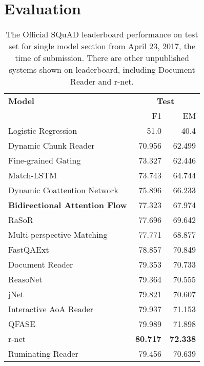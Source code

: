 \documentclass[11pt,letterpaper]{article}
\begin{document}
\section{Evaluation}
\begin{table}[t]
\renewcommand{\thefootnote}{\fnsymbol{footnote}}
\begin{threeparttable}

\centering
\small
\begin{tabular}{l r r}
\toprule

{\bf Model} &
\multicolumn{2}{c}{\bf Test} \\

{}    & F1 & EM \\
\midrule
Logistic Regression\tnote{a} & 51.0 & 40.4\\ 
Dynamic Chunk Reader\tnote{b} & 70.956  & 62.499\\ 
Fine-grained Gating\tnote{c} & 73.327  & 62.446\\ 
Match-LSTM\tnote{d} & 73.743  & 64.744\\
Dynamic Coattention Network\tnote{e} & 75.896  & 66.233\\ 
\textbf{Bidirectional Attention Flow}\tnote{f} & 77.323  & 67.974\\
RaSoR\tnote{g} & 77.696  & 69.642\\
Multi-perspective Matching\tnote{h}& 77.771  & 68.877 \\ 
FastQAExt\tnote{i}& 78.857 & 70.849 \\
Document Reader\tnote{j} & 79.353 & 70.733\\
ReasoNet\tnote{k}& 79.364 & 70.555  \\
jNet\tnote{l}& 79.821  & 70.607 \\
Interactive AoA Reader\tnote{} & 79.937 & 71.153 \\
QFASE\tnote{} & 79.989 & 71.898 \\
r-net\tnote{} & \textbf{80.717} & \textbf{72.338} \\
\midrule
Ruminating Reader & 79.456 & 70.639 \\
\bottomrule

\end{tabular}
\caption{The Official SQuAD leaderboard performance on test set for single model section from April 23, 2017, the time of submission. There are other unpublished systems shown on leaderboard, including Document Reader and r-net.}\label{tab:results}


\end{threeparttable}
\end{table}
\end{document}
